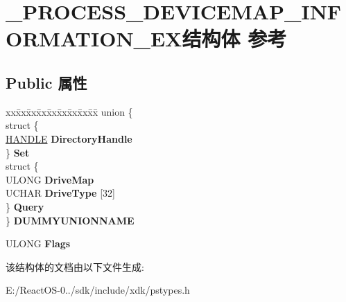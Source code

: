 \hypertarget{struct___p_r_o_c_e_s_s___d_e_v_i_c_e_m_a_p___i_n_f_o_r_m_a_t_i_o_n___e_x}{}\section{\+\_\+\+P\+R\+O\+C\+E\+S\+S\+\_\+\+D\+E\+V\+I\+C\+E\+M\+A\+P\+\_\+\+I\+N\+F\+O\+R\+M\+A\+T\+I\+O\+N\+\_\+\+E\+X结构体 参考}
\label{struct___p_r_o_c_e_s_s___d_e_v_i_c_e_m_a_p___i_n_f_o_r_m_a_t_i_o_n___e_x}
\subsection*{Public 属性}
\begin{DoxyCompactItemize}
\item 
\mbox{\label{struct___p_r_o_c_e_s_s___d_e_v_i_c_e_m_a_p___i_n_f_o_r_m_a_t_i_o_n___e_x_a67f21dac1a393a9078476bd7a3fc375f}} 
\begin{tabbing}
xx\=xx\=xx\=xx\=xx\=xx\=xx\=xx\=xx\=\kill
union \{\\
\>struct \{\\
\>\>\hyperlink{interfacevoid}{HANDLE} {\bfseries DirectoryHandle}\\
\>\} {\bfseries Set}\\
\>struct \{\\
\>\>ULONG {\bfseries DriveMap}\\
\>\>UCHAR {\bfseries DriveType} \mbox{[}32\mbox{]}\\
\>\} {\bfseries Query}\\
\} {\bfseries DUMMYUNIONNAME}\\

\end{tabbing}\item 
\mbox{\label{struct___p_r_o_c_e_s_s___d_e_v_i_c_e_m_a_p___i_n_f_o_r_m_a_t_i_o_n___e_x_a4ceedcd4d625ccdbdbfc6c2065cb268a}} 
U\+L\+O\+NG {\bfseries Flags}
\end{DoxyCompactItemize}


该结构体的文档由以下文件生成\+:\begin{DoxyCompactItemize}
\item 
E\+:/\+React\+O\+S-\/0../sdk/include/xdk/pstypes.\+h\end{DoxyCompactItemize}
